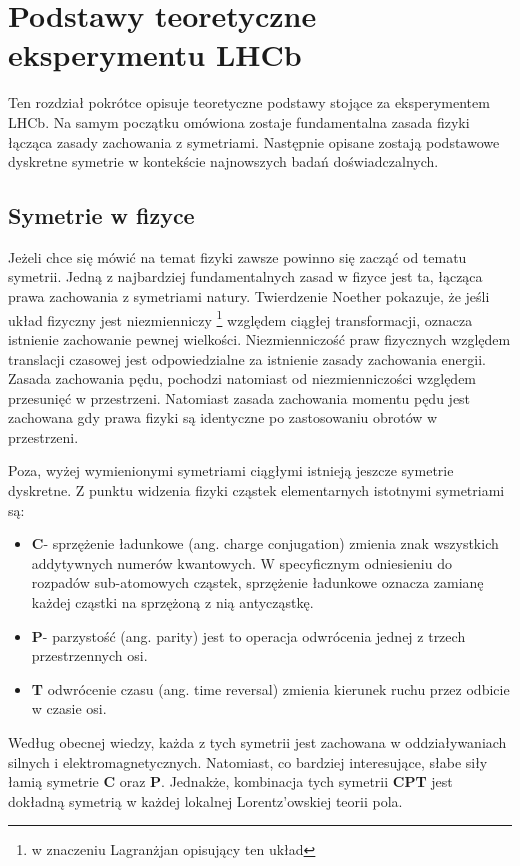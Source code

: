 \chapter{Podstawy teoretyczne eksperymentu LHCb}

Ten rozdział pokrótce opisuje teoretyczne podstawy stojące za eksperymentem LHCb. Na samym początku omówiona zostaje fundamentalna zasada fizyki łącząca zasady zachowania z symetriami. Następnie opisane zostają podstawowe dyskretne symetrie w kontekście najnowszych badań doświadczalnych.   

\section{Symetrie w fizyce}
Jeżeli chce się mówić na temat fizyki zawsze powinno się zacząć od tematu symetrii. Jedną z najbardziej fundamentalnych zasad w fizyce jest ta, łącząca prawa zachowania z symetriami natury. Twierdzenie Noether pokazuje, że jeśli układ fizyczny jest niezmienniczy \footnote{w znaczeniu Lagranżjan opisujący ten układ} względem ciągłej transformacji, oznacza istnienie zachowanie pewnej wielkości. Niezmienniczość praw fizycznych względem translacji czasowej jest odpowiedzialne za istnienie zasady zachowania energii. Zasada zachowania pędu, pochodzi natomiast od niezmienniczości względem przesunięć w przestrzeni. Natomiast zasada zachowania momentu pędu jest zachowana gdy prawa fizyki są identyczne po zastosowaniu obrotów w przestrzeni. 

Poza, wyżej wymienionymi symetriami ciągłymi istnieją jeszcze symetrie dyskretne. Z punktu widzenia fizyki cząstek elementarnych istotnymi symetriami są:

\begin{itemize}
\item \textbf{C}- sprzężenie ładunkowe (ang. charge conjugation) zmienia znak wszystkich addytywnych numerów kwantowych. W specyficznym odniesieniu do rozpadów sub-atomowych cząstek, sprzężenie ładunkowe oznacza zamianę każdej cząstki na sprzężoną z nią antycząstkę.
\item \textbf{P}- parzystość (ang. parity) jest to operacja odwrócenia jednej z trzech przestrzennych osi.
\item \textbf{T} odwrócenie czasu (ang. time reversal) zmienia kierunek ruchu przez odbicie w czasie osi. 
\end{itemize}

Według obecnej wiedzy, każda z tych symetrii jest zachowana w oddziaływaniach silnych i elektromagnetycznych. Natomiast, co bardziej interesujące, słabe siły łamią symetrie \textbf{C} oraz \textbf{P}. Jednakże, kombinacja tych symetrii \textbf{CPT} jest dokładną symetrią w każdej lokalnej Lorentz'owskiej teorii pola.

